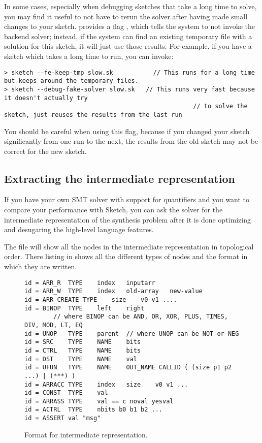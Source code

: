 In some cases, especially when debugging sketches that take a long time to solve, you may find it useful to not have to rerun the solver after having made small changes to your sketch. \Sk{} provides a flag , which tells the system to not invoke the backend solver; instead, if the system can find an existing temporary file with a solution for this sketch, it will just use those results. For example, if you have a sketch  which takes a long time to run, you can invoke:
\begin{lstlisting}
> sketch --fe-keep-tmp slow.sk           // This runs for a long time but keeps around the temporary files.
> sketch --debug-fake-solver slow.sk   // This runs very fast because it doesn't actually try
                                                    // to solve the sketch, just reuses the results from the last run
\end{lstlisting}
You should be careful when using this flag, because if you changed your sketch significantly from one run to the next, the results from the old sketch may not be correct for the new sketch.




\subsection{Extracting the intermediate representation}
If you have your own SMT solver with support for quantifiers and you want to compare your performance with Sketch, you can ask the solver for the intermediate representation of the synthesis problem after it is done optimizing and desugaring the high-level language features.


The file will show all the nodes in the intermediate representation in topological order. There listing in  shows all the different types of nodes and the format in which they are written.
\begin{figure}
\begin{lstlisting}
id = ARR_R	TYPE	index	inputarr
id = ARR_W	TYPE	index	old-array	new-value
id = ARR_CREATE TYPE	size	v0 v1 ....
id = BINOP	TYPE	left	right
        // where BINOP can be AND, OR, XOR, PLUS, TIMES, DIV, MOD, LT, EQ
id = UNOP	TYPE	parent	// where UNOP can be NOT or NEG
id = SRC	TYPE	NAME	bits
id = CTRL	TYPE	NAME	bits
id = DST	TYPE	NAME	val
id = UFUN	TYPE	NAME	OUT_NAME CALLID ( (size p1 p2 ...) | (***) )
id = ARRACC	TYPE	index 	size	v0 v1 ...
id = CONST	TYPE	val
id = ARRASS	TYPE	val == c noval yesval
id = ACTRL	TYPE	nbits b0 b1 b2 ...
id = ASSERT	val	"msg"
\end{lstlisting}
\caption{Format for intermediate representation.}
\end{figure}
